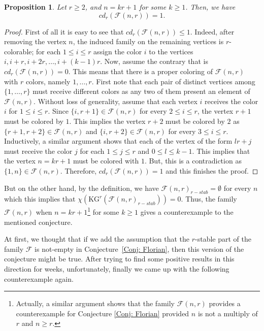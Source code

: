 \documentclass[preprint,12pt,3p]{elsarticle}
\newtheorem{proposition}[theorem]{Proposition}
\begin{document}
\begin{proposition}
Let $r\geq 2$, and $n=kr+1$ for some $k\geq 1$. Then, we have 
$$cd_r\left(\mathcal{F}(n,r)\right)= 1.$$
\end{proposition}
\begin{proof}
First of all it is easy to see that $cd_r\left(\mathcal{F}(n,r)\right)\leq 1$. Indeed, after removing the vertex $n$, the induced family on the remaining vertices is $r$-colorable; for each $1\leq i\leq r$ assign the color $i$ to the vertices $i, i+r, i+2r, \ldots, i+(k-1)r$. Now, assume the contrary that is $cd_r\left(\mathcal{F}(n,r)\right)=0$. This means that there is a proper coloring of $\mathcal{F}(n,r)$ with $r$ colors, namely $1, \ldots, r$. First note that each pair of distinct vertices among $\{1, \ldots, r\}$ must receive different colors as any two of them present an element of $\mathcal{F}(n,r)$. Without loss of generality, assume that each vertex $i$ receives the color $i$ for $1\leq i\leq r$. Since $\{i, r+1\}\in\mathcal{F}(n,r)$ for every $2\leq i\leq r$, the vertex $r+1$ must be colored by $1$. This implies the vertex $r+2$ must be colored by $2$ as $\{r+1, r+2\}\in\mathcal{F}(n,r)$ and $\{i, r+2\}\in\mathcal{F}(n,r)$ for every $3\leq i\leq r$. Inductively, a similar argument shows that each of the vertex of the form $lr+j$ must receive the color $j$ for each $1\leq j\leq r$ and $0\leq l\leq k-1$. This implies that the vertex $n=kr+1$ must be colored with $1$. But, this is a contradiction as $\{1, n\}\in\mathcal{F}(n,r)$. Therefore,  $cd_r\left(\mathcal{F}(n,r)\right)= 1$ and this finishes the proof. 
\end{proof}
But on the other hand, by the definition, we have $\mathcal{F}(n,r)_{r-stab}=\emptyset$ for every $n$ which this implies that $\chi\left({\textrm{KG}}^r\left({\mathcal{F}(n,r)}_{r-stab}\right)\right)= 0$. Thus, the family $\mathcal{F}(n,r)$ when $n=kr+1$\footnote{Actually, a similar argument shows that the family $\mathcal{F}(n,r)$ provides a counterexample for Conjecture \ref{Conj: Florian} provided $n$ is not a multiply of $r$ and $n\geq r$.} for some $k\geq 1$ gives a counterexample to the mentioned conjecture.
\vspace{0.2cm}

At first, we thought that if we add the assumption that the $r$-stable part of the family $\mathcal{F}$ is not-empty in Conjecture~\ref{Conj: Florian}, then this version of the conjecture might be true. After trying to find some positive results in this direction for weeks, unfortunately, finally we came up with the following counterexample again. 
\end{document}
